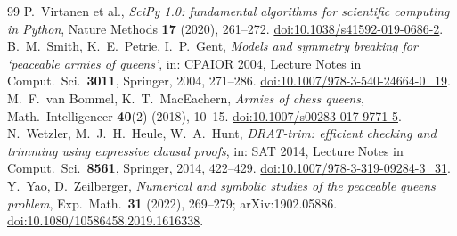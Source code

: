 \documentclass[11pt]{article}
\theoremstyle{remark}
\begin{document}
\begin{thebibliography}{99}
 P.~Virtanen et al., \emph{SciPy 1.0: fundamental algorithms for scientific computing in
Python}, Nature Methods \textbf{17} (2020), 261--272.
\href{https://doi.org/10.1038/s41592-019-0686-2}{doi:10.1038/s41592-019-0686-2}.
 B.~M.~Smith, K.~E.~Petrie, I.~P.~Gent, \emph{Models and symmetry breaking for `peaceable
armies of queens'}, in: CPAIOR 2004, Lecture Notes in Comput.\ Sci.\ \textbf{3011}, Springer, 2004,
271--286. \href{https://doi.org/10.1007/978-3-540-24664-0_19}{doi:10.1007/978-3-540-24664-0\_19}.
 M.~F.~van Bommel, K.~T.~MacEachern, \emph{Armies of chess queens}, Math.\ Intelligencer
\textbf{40}(2) (2018), 10--15. \href{https://doi.org/10.1007/s00283-017-9771-5}{doi:10.1007/s00283-017-9771-5}.
 N.~Wetzler, M.~J.~H.~Heule, W.~A.~Hunt, \emph{DRAT-trim: efficient checking and trimming
using expressive clausal proofs}, in: SAT 2014, Lecture Notes in Comput.\ Sci.\ \textbf{8561}, Springer,
2014, 422--429. \href{https://doi.org/10.1007/978-3-319-09284-3_31}{doi:10.1007/978-3-319-09284-3\_31}.
 Y.~Yao, D.~Zeilberger, \emph{Numerical and symbolic studies of the peaceable queens
problem}, Exp.\ Math.\ \textbf{31} (2022), 269--279; arXiv:1902.05886.
\href{https://doi.org/10.1080/10586458.2019.1616338}{doi:10.1080/10586458.2019.1616338}.
\end{thebibliography}
\end{document}
